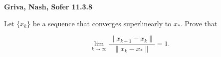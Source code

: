 \textbf{Griva, Nash, Sofer 11.3.8}

Let $\{ x_k \}$ be a sequence that converges superlinearly to $x_*$. Prove that 

$$
\lim\limits_{k \to \infty} \frac{\lVert x_{k+1} - x_k \rVert}{\lVert x_k - x_* \rVert} = 1.
$$

\begin{solution}
    \ \\
    \vfill
\end{solution}
